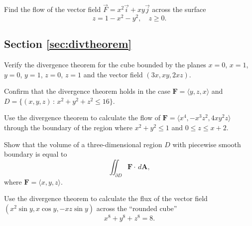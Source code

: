\documentclass[svgnames]{watsonbook}
\begin{document}
\begin{exercise}{}{}
Find the flow of the vector field $\vec{F} = x^2\vec{i} + xy\vec{j}$ across the surface 
\[
z = 1-x^2-y^2, \quad z \geq 0. 
\]
\end{exercise}

\subsection*{Section \ref{sec:divtheorem}}

\begin{exercise}{}{}
  Verify the divergence theorem for the cube bounded by the planes
  $x=0$, $x=1$, $y=0$, $y=1$, $z=0$, $z=1$ and the vector field
  $(3x,xy,2xz)$.
\end{exercise}

\begin{exercise}{}{}
  Confirm that the divergence theorem holds in the case $\mathbf{F} =
  \langle y, z, x \rangle$ and $D = \{(x,y,z) \,: \, x^2 + y^2 + z^2
  \leq 16\}$. 
\end{exercise}

\begin{exercise}{}{}
  Use the divergence theorem to calculate the flow of $\mathbf{F} =
  \langle x^4, -x^3 z^2, 4xy^2 z \rangle$ through the boundary of the
  region where $x^2 + y^2 \leq 1$ and $0 \leq z
  \leq x + 2$. 
\end{exercise}

\begin{exercise}{}{}
  Show that the volume of a three-dimensional region $D$ with
  piecewise smooth boundary is equal to 
  \[
  \iint_{\partial D} \mathbf{F} \cdot \, d\mathbf{A},
  \]
  where $\mathbf{F} =\langle x, y, z \rangle$. 
\end{exercise}

\begin{exercise}{}{}
  \begin{minipage}[t]{0.7\linewidth}
    Use the divergence theorem to calculate the flux of the vector
    field $(x^2 \sin y, x \cos y, -xz \sin y)$ across the ``rounded
    cube'' \[x^8 + y^8 + z^8 = 8.\]
  \end{minipage} 
  \begin{minipage}[t]{0.3\linewidth}
    \begin{center}
    \end{center}
  \end{minipage}
\end{exercise}
\end{document}
